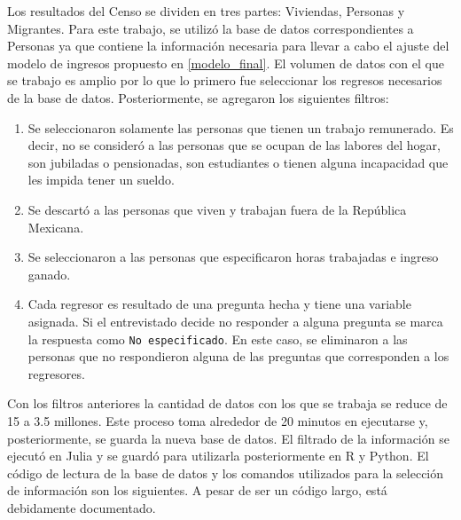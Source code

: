 Los resultados del Censo se dividen en tres partes: Viviendas, Personas y Migrantes. Para este trabajo, se utilizó la base de datos correspondientes a Personas ya que contiene la información necesaria para llevar a cabo el ajuste del modelo de ingresos propuesto en \ref{modelo_final}. El volumen de datos con el que se trabajo es amplio por lo que lo primero fue seleccionar los regresos necesarios de la base de datos. Posteriormente, se agregaron los siguientes filtros:

\begin{enumerate}
    \item Se seleccionaron solamente las personas que tienen un trabajo remunerado. Es decir, no se consideró a las personas que
    se ocupan de las labores del hogar, son jubiladas o pensionadas, son estudiantes o tienen alguna incapacidad que les impida tener un sueldo. 
    
    \item Se descartó a las personas que viven y trabajan fuera de la República Mexicana. 
    
    \item Se seleccionaron a las personas que especificaron horas trabajadas e ingreso ganado.
    
    \item Cada regresor es resultado de una pregunta hecha y tiene una variable asignada. Si el entrevistado decide no responder a alguna pregunta se marca la respuesta como \texttt{No especificado}. En este caso, se eliminaron a las personas que no respondieron alguna de las preguntas que corresponden a los regresores. 
\end{enumerate}

Con los filtros anteriores la cantidad de datos con los que se trabaja se reduce de 15 a 3.5 millones. Este proceso toma alrededor de 20 minutos en ejecutarse y, posteriormente, se guarda la nueva base de datos. El filtrado de la información se ejecutó en \textsf{Julia} y se guardó para utilizarla posteriormente en \textsf{R} y \textsf{Python}. El código de lectura de la base de datos y los comandos utilizados para la selección de información son los siguientes. A pesar de ser un código largo, está debidamente documentado. 


